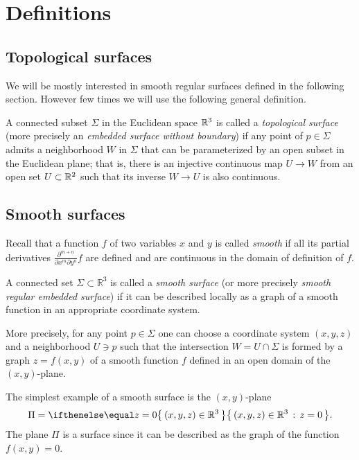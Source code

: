 \chapter{Definitions}

\section{Topological surfaces}

We will be mostly interested in smooth regular surfaces defined in the following section.
However few times we will use the following general definition.

A connected subset $\Sigma$ in the Euclidean space $\mathbb{R}^3$
is called a \emph{topological surface} (more precisely an {}\emph{embedded surface without boundary}) 
if any point of $p\in \Sigma$ admits a neighborhood $W$ in $\Sigma$ 
that can be parameterized by an open subset in the Euclidean plane; %
that is, there is an injective continuous map $U\to W$ from an open set $U\subset \mathbb{R}^2$ such that its inverse $W\to U$ is also continuous.


\section{Smooth surfaces}

Recall that a function $f$ of two variables $x$ and $y$ is called \emph{smooth} if all its partial derivatives $\frac{\partial^{m+n}}{\partial x^m\partial y^n}f$ are defined and are continuous in the domain of definition of $f$. 

A connected set $\Sigma \subset \mathbb{R}^3$ is called a \emph{smooth surface} (or more precisely {}\emph{smooth regular embedded surface}) if it can be described locally as a graph of a smooth function in an appropriate coordinate system.\label{page:def-smooth-surface} %

More precisely, for any point $p\in \Sigma$ one can choose a coordinate system $(x,y,z)$ and a neighborhood $U\ni p$ such that
the intersection $W=U\cap \Sigma$ is formed by a graph $z=f(x,y)$ of a smooth function $f$ defined in an open domain of the $(x,y)$-plane.

The simplest example of a smooth surface is the $(x,y)$-plane 
\[\Pi=\set{(x,y,z)\in\RR^3}{z=0}.\]
The plane $\Pi$ is a surface since
it can be described as the graph of the function $f(x,y)=0$.

